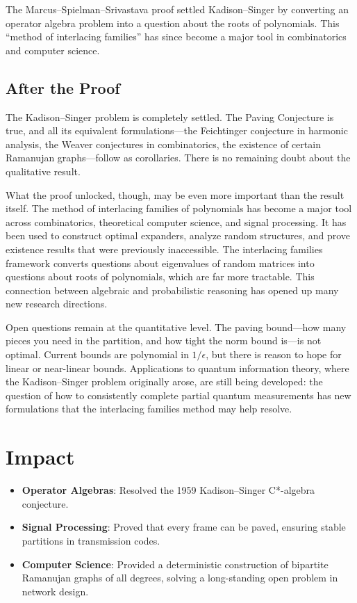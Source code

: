 \begin{highlightbox}
The Marcus--Spielman--Srivastava proof settled Kadison--Singer by converting an operator algebra problem into a question about the roots of polynomials. This ``method of interlacing families'' has since become a major tool in combinatorics and computer science.
\end{highlightbox}

\subsection{After the Proof}

The Kadison--Singer problem is completely settled. The Paving Conjecture is true, and all its equivalent formulations---the Feichtinger conjecture in harmonic analysis, the Weaver conjectures in combinatorics, the existence of certain Ramanujan graphs---follow as corollaries. There is no remaining doubt about the qualitative result.

What the proof unlocked, though, may be even more important than the result itself. The method of interlacing families of polynomials has become a major tool across combinatorics, theoretical computer science, and signal processing. It has been used to construct optimal expanders, analyze random structures, and prove existence results that were previously inaccessible. The interlacing families framework converts questions about eigenvalues of random matrices into questions about roots of polynomials, which are far more tractable. This connection between algebraic and probabilistic reasoning has opened up many new research directions.

Open questions remain at the quantitative level. The paving bound---how many pieces you need in the partition, and how tight the norm bound is---is not optimal. Current bounds are polynomial in $1/\epsilon$, but there is reason to hope for linear or near-linear bounds. Applications to quantum information theory, where the Kadison--Singer problem originally arose, are still being developed: the question of how to consistently complete partial quantum measurements has new formulations that the interlacing families method may help resolve.

\section{Impact}
\begin{itemize}
\item \textbf{Operator Algebras}: Resolved the 1959 Kadison--Singer C*-algebra conjecture.
\item \textbf{Signal Processing}: Proved that every frame can be paved, ensuring stable partitions in transmission codes.
\item \textbf{Computer Science}: Provided a deterministic construction of bipartite Ramanujan graphs of all degrees, solving a long-standing open problem in network design.
\end{itemize}

